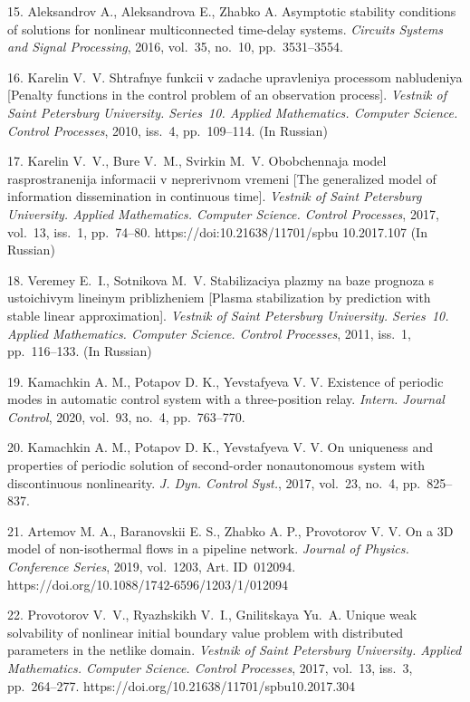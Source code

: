 {15. Aleksandrov A., Aleksandrova E., Zhabko A. Asymptotic stability conditions of solutions for nonlinear multiconnected time-delay systems. \emph{Circuits  Systems and Signal Processing}, 2016, vol.~35, no.~10, pp.~3531--3554.

16.	Karelin V.~V.  Shtrafnye funkcii v zadache upravleniya processom nabludeniya [Penalty functions in the control problem of an observation process]. \emph{Vestnik of Saint Petersburg University. Series~10. Applied Mathematics. Computer Science. Control Processes}, 2010, iss.~4, pp.~109--114. (In Russian)

17. Karelin V.~V., Bure V.~M., Svirkin M.~V. Obobchennaja model rasprostranenija informacii v neprerivnom vremeni [The generalized model of information dissemination in continuous time]. \textit{Vestnik of Saint Petersburg University. Applied Mathematics. Computer Science. Control Processes}, 2017, vol.~13, iss.~1, pp.~74--80. https://doi:10.21638/11701/spbu 10.2017.107 (In Russian)

18.	Veremey E.~I., Sotnikova M.~V. Stabilizaciya plazmy na baze prognoza s ustoichivym lineinym priblizheniem [Plasma stabilization by prediction with stable linear approximation]. \emph{Vestnik of Saint Petersburg University. Series~10. Applied Mathematics. Computer Science. Control Processes}, 2011, iss.~1, pp.~116--133. (In Russian)

19.	Kamachkin A. M., Potapov D. K., Yevstafyeva V. V. Existence of periodic modes in automatic control system with a three-position relay. \emph{Intern. Journal Control}, 2020, vol.~93, no.~4, pp.~763--770.

20. Kamachkin A. M., Potapov D. K., Yevstafyeva V. V. On uniqueness and properties of periodic solution of second-order nonautonomous system with discontinuous nonlinearity. \emph{J. Dyn. Control Syst.}, 2017, vol.~23, no.~4, pp.~825--837.

21. Artemov M. A.,  Baranovskii E. S., Zhabko A. P., Provotorov V. V.  On a 3D model of non-iso\-ther\-mal flows in a pipeline network. \emph{Journal of Physics. Conference Series}, 2019, vol.~1203, Art. ID~012094. https://doi.org/10.1088/1742-6596/1203/1/012094

22. Provotorov V.~V., Ryazhskikh V.~I., Gnilitskaya Yu.~A.  Unique weak solvability of nonlinear initial boundary value problem with distributed parameters in the netlike domain. \emph{Vestnik of Saint Petersburg University. Applied Mathematics. Computer Science. Control Processes}, 2017, vol.~13, iss.~3, pp.~264--277. https://doi.org/10.21638/11701/spbu10.2017.304


}
